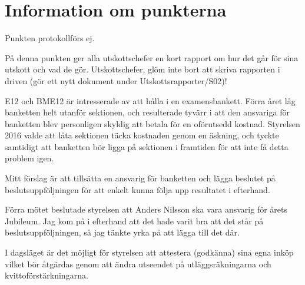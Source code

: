 \documentclass[10pt]{article}
\def\doctype{Handlingar} %
\def\mname{styrelsemöte} %
\def\mnum{S02/17} %
\begin{document}
\heading{{\doctype} till {\mname} {\mnum}}

\section*{Information om punkterna}

\begin{paragrafer}

\begin{paragrafer}
Punkten protokollförs ej.

På denna punkten ger alla utskottschefer en kort rapport om hur det går för sina utskott och vad de gör. Utskottschefer, glöm inte bort att skriva rapporten i driven (gör ett nytt dokument under Utskottsrapporter/S02)!

\end{paragrafer}

E12 och BME12 är intresserade av att hålla i en examensbankett. Förra året låg banketten helt utanför sektionen, och resulterade tyvärr i att den ansvariga för banketten blev personligen skyldig att betala för en oförutsedd kostnad. Styrelsen 2016 valde att låta sektionen täcka kostnaden genom en äskning, och tyckte samtidigt att banketten bör ligga på sektionen i framtiden för att inte få detta problem igen.

Mitt förslag är att tillsätta en ansvarig för banketten och lägga beslutet på beslutsuppföljningen för att enkelt kunna följa upp resultatet i efterhand.


Förra mötet beslutade styrelsen att Anders Nilsson ska vara ansvarig för årets Jubileum. Jag kom på i efterhand att det hade varit bra att det står på beslutsuppföljningen, så jag tänkte yrka på att lägga till det där.




I dagsläget är det möjligt för styrelsen att attestera (godkänna) sina egna inköp vilket bör åtgärdas genom att ändra utseendet på utläggsräkningarna och kvittoförstärkningarna.



\end{paragrafer}
\end{document}
